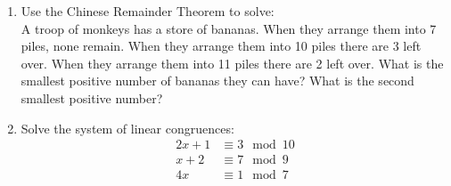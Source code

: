 \documentclass[class=article, crop=false]{standalone}
\begin{document}
\begin{enumerate}
\item
  Use the Chinese Remainder Theorem to solve:
  \\A troop of monkeys has a store of bananas.
  When they arrange them into 7 piles, none remain.
  When they arrange them into 10 piles there are 3 left over.
  When they arrange them into 11 piles there are 2 left over.
  What is the smallest positive number of bananas they can have?
  What is the second smallest positive number?

\item
  Solve the system of linear congruences:
  \begin{align*}
	2x+1 & \equiv 3\mod 10 \\
	x+2 & \equiv 7\mod 9 \\
	4x & \equiv 1\mod 7
  \end{align*}

\end{enumerate}
\end{document}
